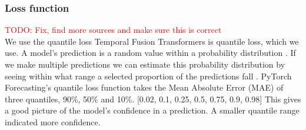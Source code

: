     \subsubsection{Loss function}\label{sec:loss_function}
    \textcolor{red}{TODO: Fix, find more sources and make sure this is correct}\\
    We use the quantile loss  Temporal Fusion Transformers is quantile loss, which we use.
    A model's prediction is a random value within a probability distribution \cite{}. If we make multiple predictions we can estimate this probability distribution by seeing within what range a selected proportion of the predictions fall \cite{koenker_quantile_2001}. PyTorch Forecasting's quantile loss function takes the Mean Absolute Error (MAE) of three quantiles, 90\%, 50\% and 10\%. [0.02, 0.1, 0.25, 0.5, 0.75, 0.9, 0.98] This gives a good picture of the model's confidence in a prediction. A smaller quantile range indicated more confidence.
    